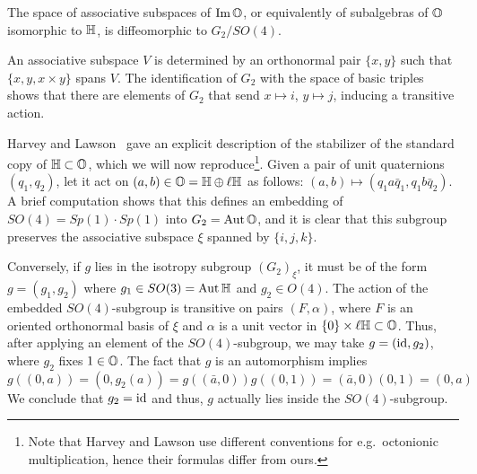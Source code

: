 \begin{prop}
	The space of associative subspaces of $\operatorname{Im}\mathbb{O}$, or equivalently of subalgebras of $\mathbb{O}$ isomorphic to $\mathbb{H}$, is diffeomorphic to $G_2/SO(4)$.
\end{prop}
\begin{myproof}
	An associative subspace $V$ is determined by an orthonormal pair $\{x,y\}$ such that $\{x,y,x\times y\}$ spans $V$. The identification of $G_2$ with the space of basic triples shows that there are elements of $G_2$ that send $x\mapsto i$, $y\mapsto j$, inducing a transitive action. 
	
	Harvey and Lawson~\cite[Ch.~IV, Thm.~1.8]{HL1982} gave an explicit description of the stabilizer of the standard copy of $\mathbb{H}\subset \mathbb{O}$, which we will now reproduce\footnote{Note that Harvey and Lawson use different conventions for e.g.~octonionic multiplication, hence their formulas differ from ours.}. Given a pair of unit quaternions $(q_1,q_2)$, let it act on $(a,b)\in \mathbb{O}=\mathbb{H}\oplus\ell\mathbb{H}$ as follows: $(a,b)\mapsto (q_1a\bar q_1,q_1b\bar q_2)$. A brief computation shows that this defines an embedding of $SO(4)=Sp(1)\cdot Sp(1)$ into $G_2=\operatorname{Aut} \mathbb{O}$, and it is clear that this subgroup preserves the associative subspace $\xi$ spanned by $\{i,j,k\}$.
	
	Conversely, if $g$ lies in the isotropy subgroup $(G_2)_\xi$, it must be of the form $g=(g_1,g_2)$ where $g_1\in SO(3)=\operatorname{Aut}\mathbb{H}$ and $g_2\in O(4)$. The action of the embedded $SO(4)$-subgroup is transitive on pairs $(F,\alpha)$, where $F$ is an oriented orthonormal basis of $\xi$ and $\alpha$ is a unit vector in $\{0\}\times \ell\mathbb{H}\subset \mathbb{O}$. Thus, after applying an element of the $SO(4)$-subgroup, we may take $g=(\operatorname{id},g_2)$, where $g_2$ fixes $1\in\mathbb{O}$. The fact that $g$ is an automorphism implies 
	\begin{equation*}
		g((0,a))=(0,g_2(a))=g((\bar a,0))g((0,1))=(\bar a,0)(0,1)=(0,a)
	\end{equation*}
	We conclude that $g_2=\operatorname{id}$ and thus, $g$ actually lies inside the $SO(4)$-subgroup.
\end{myproof}

